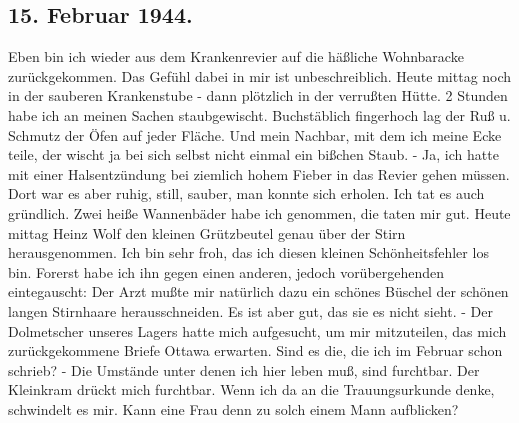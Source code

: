\subsection{15. Februar 1944.}

Eben bin ich wieder aus dem Krankenrevier auf die h\"{a}{\ss}liche Wohnbaracke zur\"{u}ckgekommen.
Das Gef\"{u}hl dabei in mir ist unbeschreiblich.
Heute mittag noch in der sauberen Krankenstube - dann pl\"{o}tzlich in der verru{\ss}ten H\"{u}tte.
2 Stunden habe ich an meinen Sachen staubgewischt.
Buchst\"{a}blich fingerhoch lag der Ru{\ss} u. Schmutz der \"{O}fen auf jeder Fl\"{a}che.
Und mein Nachbar, mit dem ich meine Ecke teile, der wischt ja bei sich selbst nicht einmal ein bi{\ss}chen Staub.
- Ja, ich hatte mit einer Halsentz\"{u}ndung bei ziemlich hohem Fieber in das Revier gehen m\"{u}ssen.
Dort war es aber ruhig, still, sauber, man konnte sich erholen.
Ich tat es auch gr\"{u}ndlich.
Zwei hei{\ss}e Wannenb\"{a}der habe ich genommen, die taten mir gut.
Heute mittag Heinz Wolf den kleinen Gr\"{u}tzbeutel genau \"{u}ber der Stirn herausgenommen.
Ich bin sehr froh, das ich diesen kleinen Sch\"{o}nheitsfehler los bin.
Forerst habe ich ihn gegen einen anderen, jedoch vor\"{u}bergehenden eintegauscht: Der Arzt mu{\ss}te mir nat\"{u}rlich dazu ein sch\"{o}nes B\"{u}schel der sch\"{o}nen langen Stirnhaare herausschneiden.
Es ist aber gut, das sie es nicht sieht.
- Der Dolmetscher unseres Lagers hatte mich aufgesucht, um mir mitzuteilen, das mich zur\"{u}ckgekommene Briefe Ottawa erwarten.
Sind es die, die ich im Februar schon schrieb?
- Die Umst\"{a}nde unter denen ich hier leben mu{\ss}, sind furchtbar.
Der Kleinkram dr\"{u}ckt mich furchtbar.
Wenn ich da an die Trauungsurkunde denke, schwindelt es mir.
Kann eine Frau denn zu solch einem Mann aufblicken?

\clearpage
